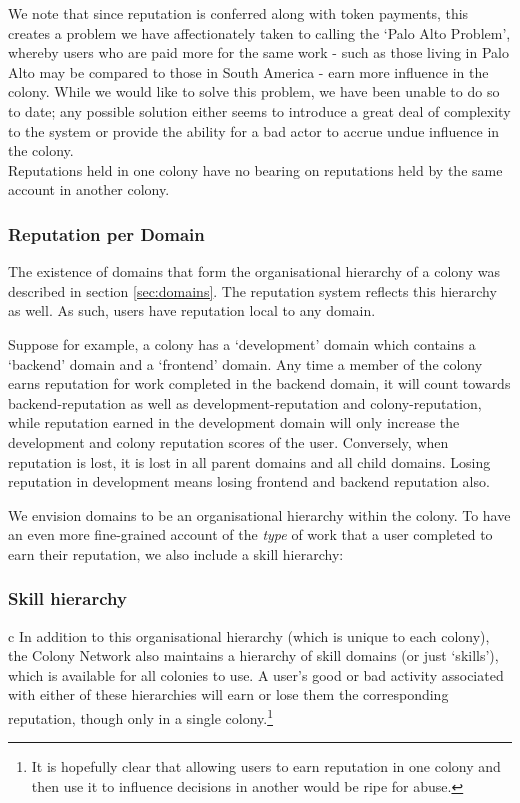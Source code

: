 We note that since reputation is conferred along with token payments, this creates a problem we have affectionately taken to calling the `Palo Alto Problem', whereby users who are paid more for the same work - such as those living in Palo Alto may be compared to those in South America - earn more influence in the colony. While we would like to solve this problem, we have been unable to do so to date; any possible solution either seems to introduce a great deal of complexity to the system or provide the ability for a bad actor to accrue undue influence in the colony.\\
%

Reputations held in one colony have no bearing on reputations held by the same account in another colony.
%
%
\subsubsection{Reputation per Domain}\label{sec:rep-by-domain}
The existence of domains that form the organisational hierarchy of a colony was described in section \ref{sec:domains}. The reputation system reflects this hierarchy as well. As such, users have reputation local to any domain.

Suppose for example, a colony has a `development' domain which contains a `backend' domain and a `frontend' domain. Any time a member of the colony earns reputation for work completed in the backend domain, it will count towards backend-reputation as well as development-reputation and colony-reputation, while reputation earned in the development domain will only increase the development and colony reputation scores of the user. Conversely, when reputation is lost, it is lost in all parent domains and all child domains. Losing reputation in development means losing frontend and backend reputation also. 

We envision domains to be an organisational hierarchy within the colony. To have an even more fine-grained account of the \emph{type} of work that a user completed to earn their reputation, we also include a skill hierarchy:

\subsubsection{Skill hierarchy}\label{sec:rep-by-skill}

c In addition to this organisational hierarchy (which is unique to each colony), the Colony Network also maintains a hierarchy of skill domains (or just `skills'), which is available for all colonies to use. A user's good or bad activity associated with either of these hierarchies will earn or lose them the corresponding reputation, though only in a single colony.\footnote{It is hopefully clear that allowing users to earn reputation in one colony and then use it to influence decisions in another would be ripe for abuse.}

